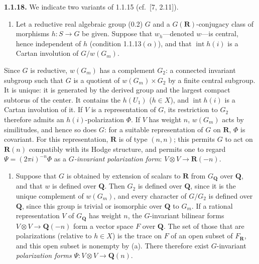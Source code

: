 \documentclass[10pt,a4paper]{article}
\providecommand{\tightlist}{\setlength{\itemsep}{0pt}\setlength{\parskip}{0pt}}
\begin{document}
\textbf{1.1.18.} We indicate two variants of 1.1.15 (cf.~{[}7, 2.11{]}).

\begin{enumerate}
\def\labelenumi{(\alph{enumi})}
\tightlist
\item
  Let a reductive real algebraic group (0.2) \(G\) and a \(G(\mathbf R)\)-conjugacy class of morphisms \(h:S\to G\) be given. Suppose that \(w_h\)---denoted \(w\)---is central, hence independent of \(h\) (condition 1.1.13\((\alpha)\)), and that \(\operatorname{int}h(i)\) is a Cartan involution of \(G/w(G_m)\).
\end{enumerate}

Since \(G\) is reductive, \(w(G_m)\) has a complement \(G_2\): a connected invariant subgroup such that \(G\) is a quotient of \(w(G_m)\times G_2\) by a finite central subgroup. It is unique: it is generated by the derived group and the largest compact subtorus of the center. It contains the \(h(U_1)\) (\(h\in X\)), and \(\operatorname{int}h(i)\) is a Cartan involution of it. If \(V\) is a representation of \(G\), its restriction to \(G_2\) therefore admits an \(h(i)\)-polarization \(\Phi\). If \(V\) has weight \(n\), \(w(G_m)\) acts by similitudes, and hence so does \(G\): for a suitable representation of \(G\) on \(\mathbf R\), \(\Phi\) is covariant. For this representation, \(\mathbf R\) is of type \((n,n)\); this permits \(G\) to act on \(\mathbf R(n)\) compatibly with its Hodge structure, and permits one to regard \(\Psi=(2\pi i)^{-n}\Phi\) as a \emph{\(G\)-invariant polarization form}: \(V\otimes V\to\mathbf R(-n)\).

\begin{enumerate}
\def\labelenumi{(\alph{enumi})}
\setcounter{enumi}{1}
\tightlist
\item
  Suppose that \(G\) is obtained by extension of scalars to \(\mathbf R\) from \(G_{\mathbf Q}\) over \(\mathbf Q\), and that \(w\) is defined over \(\mathbf Q\). Then \(G_2\) is defined over \(\mathbf Q\), since it is the unique complement of \(w(G_m)\), and every character of \(G/G_2\) is defined over \(\mathbf Q\), since this group is trivial or isomorphic over \(\mathbf Q\) to \(G_m\). If a rational representation \(V\) of \(G_{\mathbf Q}\) has weight \(n\), the \(G\)-invariant bilinear forms \(V\otimes V\to\mathbf Q(-n)\) form a vector space \(F\) over \(\mathbf Q\). The set of those that are polarizations (relative to \(h\in X\)) is the trace on \(F\) of an open subset of \(F_{\mathbf R}\), and this open subset is nonempty by (a). There therefore exist \(G\)-invariant \emph{polarization forms} \(\Psi:V\otimes V\to\mathbf Q(n)\).
\end{enumerate}
\end{document}
